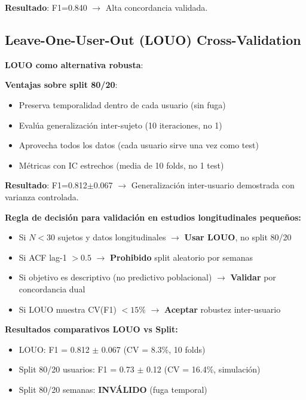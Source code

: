 \documentclass[12pt,letterpaper,twoside]{report}
\begin{document}
\begin{calculobox}
\begin{decisionbox}
\textbf{Resultado}: F1=0.840 $\to$ Alta concordancia validada.
\end{decisionbox}

\subsection{Leave-One-User-Out (LOUO) Cross-Validation}

\begin{estadisticobox}
\textbf{LOUO como alternativa robusta}:

\textbf{Ventajas sobre split 80/20}:
\begin{itemize}[noitemsep]
    \item Preserva temporalidad dentro de cada usuario (sin fuga)
    \item Evalúa generalización inter-sujeto (10 iteraciones, no 1)
    \item Aprovecha todos los datos (cada usuario sirve una vez como test)
    \item Métricas con IC estrechos (media de 10 folds, no 1 test)
\end{itemize}

\textbf{Resultado}: F1=0.812$\pm$0.067 $\to$ Generalización inter-usuario demostrada con varianza controlada.
\end{estadisticobox}

\begin{reglabox}
\textbf{Regla de decisión para validación en estudios longitudinales pequeños:}

\begin{itemize}[noitemsep]
    \item Si $N < 30$ sujetos y datos longitudinales $\to$ \textbf{Usar LOUO}, no split 80/20
    \item Si ACF lag-1 $> 0.5$ $\to$ \textbf{Prohibido} split aleatorio por semanas
    \item Si objetivo es descriptivo (no predictivo poblacional) $\to$ \textbf{Validar} por concordancia dual
    \item Si LOUO muestra CV(F1) $< 15\%$ $\to$ \textbf{Aceptar} robustez inter-usuario
\end{itemize}
\end{reglabox}

\begin{calculobox}
\textbf{Resultados comparativos LOUO vs Split:}

\begin{itemize}[noitemsep]
    \item LOUO: F1 = 0.812 $\pm$ 0.067 (CV = 8.3\%, 10 folds)
    \item Split 80/20 usuarios: F1 = 0.73 $\pm$ 0.12 (CV = 16.4\%, simulación)
    \item Split 80/20 semanas: \textbf{INVÁLIDO} (fuga temporal)
\end{itemize}


\end{calculobox}
\end{calculobox}
\end{document}
